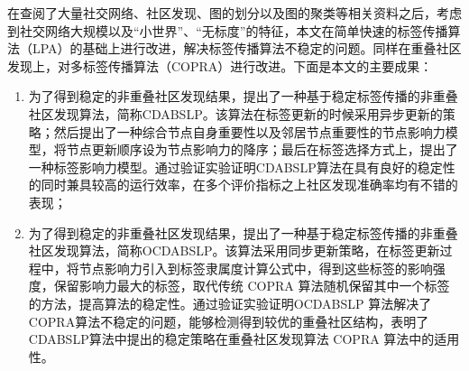 

\begin{conclusion}


在查阅了大量社交网络、社区发现、图的划分以及图的聚类等相关资料之后，考虑到社交网络大规模以及“小世界”、“无标度”的特征，本文在简单快速的标签传播算法（LPA）的基础上进行改进，解决标签传播算法不稳定的问题。同样在重叠社区发现上，对多标签传播算法（COPRA）进行改进。下面是本文的主要成果：
\begin{enumerate}
    \item 为了得到稳定的非重叠社区发现结果，提出了一种基于稳定标签传播的非重叠社区发现算法，简称CDABSLP。该算法在标签更新的时候采用异步更新的策略；然后提出了一种综合节点自身重要性以及邻居节点重要性的节点影响力模型，将节点更新顺序设为节点影响力的降序；最后在标签选择方式上，提出了一种标签影响力模型。通过验证实验证明CDABSLP算法在具有良好的稳定性的同时兼具较高的运行效率，在多个评价指标之上社区发现准确率均有不错的表现；
    \item 为了得到稳定的非重叠社区发现结果，提出了一种基于稳定标签传播的非重叠社区发现算法，简称OCDABSLP。该算法采用同步更新策略，在标签更新过程中，将节点影响力引入到标签隶属度计算公式中，得到这些标签的影响强度，保留影响力最大的标签，取代传统 COPRA 算法随机保留其中一个标签的方法，提高算法的稳定性。通过验证实验证明OCDABSLP 算法解决了COPRA算法不稳定的问题，能够检测得到较优的重叠社区结构，表明了CDABSLP算法中提出的稳定策略在重叠社区发现算法 COPRA 算法中的适用性。
\end{enumerate}



\end{conclusion}

